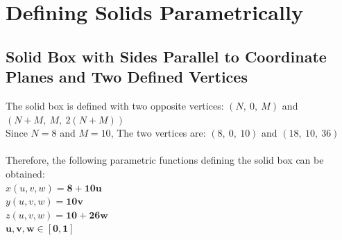 \documentclass[acmlarge,nonacm=true]{acmart}
\begin{document}
\author{Pang Yu Shao}

\renewcommand{\shortauthors}{Pang Yu Shao}










\tableofcontents
\newpage
\section{Defining Solids Parametrically}
\subsection{Solid Box with Sides Parallel to Coordinate Planes and Two Defined Vertices}
The solid box is defined with two opposite vertices: \((N,\ 0,\ M)\) and \((N+M,\  M,\  2(N+M))\)\\ 
Since \(N = 8\) and \(M = 10\),
The two vertices are: \((8,\ 0,\ 10)\) and \((18,\  10,\  36)\)\\\\
Therefore, the following parametric functions defining the solid box can be obtained:\\
\(x(u,v,w) = \mathbf{8 + 10u}\)\\
\(y(u,v,w) = \mathbf{10v}\)\\
\(z(u,v,w) = \mathbf{10 + 26w}\)\\
\(\mathbf{u,v,w \in [0,1]}\)
\end{document}

